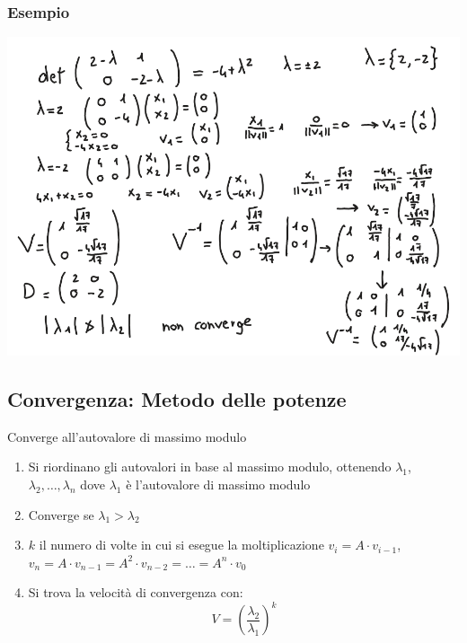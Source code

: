 \documentclass[10pt]{article}
\begin{document}
\subsubsection*{Esempio}
\begin{center}
    \includegraphics[scale=0.4]{es4pt2.png}
\end{center}
\subsection{Convergenza: Metodo delle potenze}
Converge all'autovalore di massimo modulo
\begin{enumerate}
    \item Si riordinano gli autovalori in base al massimo modulo, ottenendo $\lambda_{1}$, $\lambda_{2}, \ldots, \lambda_{n}$ dove $\lambda_{1}$ è l'autovalore di massimo modulo
    \item Converge se $\lambda_{1}>\lambda_{2}$
    \item $k$ il numero di volte in cui si esegue la moltiplicazione $v_{i} = A\cdot v_{i-1}$, $v_{n}=A\cdot v_{n-1}=A^{2}\cdot v_{n-2} = \ldots = A^{n}\cdot v_{0}$
    \item Si trova la velocità di convergenza con: \begin{equation*}
        V=\left(\frac{\lambda_{2}}{\lambda_{1}}\right)^{k}
    \end{equation*}
\end{enumerate} 
\end{document}
